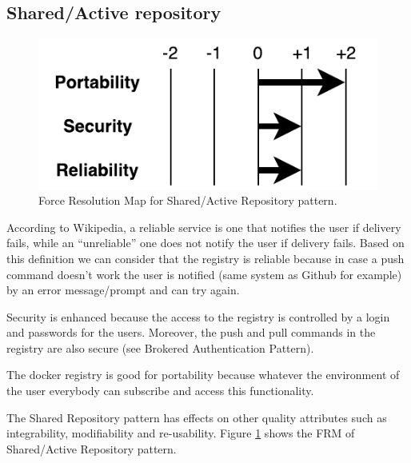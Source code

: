 \subsection{Shared/Active repository} 

\begin{figure}[H]
\centering
\includegraphics[scale=0.7]{6-evaluation/images/shared_active_repo_frm.pdf}
\caption{Force Resolution Map for Shared/Active Repository pattern.}
\label{fig:shared-active-repo-frm}
\end{figure}

According to Wikipedia, a reliable service is one that notifies the user if
delivery fails, while an ``unreliable'' one does not notify the user if delivery
fails. Based on this definition we can consider that the registry is reliable
because in case a push command doesn't work the user is notified (same system as
Github for example) by an error message/prompt and can try again.

Security is enhanced because the access to the registry is controlled by a login
and passwords for the users. Moreover, the push and pull commands in the
registry are also secure (see Brokered Authentication Pattern).

The docker registry is good for portability because whatever the environment of
the user everybody can subscribe and access this functionality.

The Shared Repository pattern has effects on other quality attributes such as
integrability, modifiability and re-usability. Figure \ref{fig:shared-active-repo-frm}
shows the FRM of Shared/Active Repository pattern.
